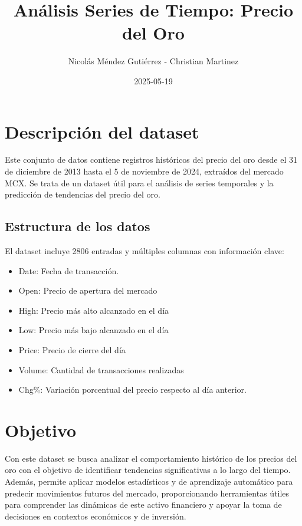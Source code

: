 \documentclass[
]{book}
\title{Análisis Series de Tiempo: Precio del Oro}
\author{Nicolás Méndez Gutiérrez - Christian Martinez}
\date{2025-05-19}
\providecommand{\tightlist}{%
  \setlength{\itemsep}{0pt}\setlength{\parskip}{0pt}}
\begin{document}
\maketitle

{
\setcounter{tocdepth}{1}
\tableofcontents
}
\chapter{Descripción del dataset}\label{descripciuxf3n-del-dataset}

Este conjunto de datos contiene registros históricos del precio del oro desde el 31 de diciembre de 2013 hasta el 5 de noviembre de 2024, extraídos del mercado MCX. Se trata de un dataset útil para el análisis de series temporales y la predicción de tendencias del precio del oro.

\section{Estructura de los datos}\label{estructura-de-los-datos}

El dataset incluye 2806 entradas y múltiples columnas con información clave:

\begin{itemize}
\tightlist
\item
  Date: Fecha de transacción.
\item
  Open: Precio de apertura del mercado
\item
  High: Precio más alto alcanzado en el día
\item
  Low: Precio más bajo alcanzado en el día
\item
  Price: Precio de cierre del día
\item
  Volume: Cantidad de transacciones realizadas
\item
  Chg\%: Variación porcentual del precio respecto al día anterior.
\end{itemize}

\chapter{Objetivo}\label{objetivo}

Con este dataset se busca analizar el comportamiento histórico de los precios del oro con el objetivo de identificar tendencias significativas a lo largo del tiempo. Además, permite aplicar modelos estadísticos y de aprendizaje automático para predecir movimientos futuros del mercado, proporcionando herramientas útiles para comprender las dinámicas de este activo financiero y apoyar la toma de decisiones en contextos económicos y de inversión.
\end{document}
